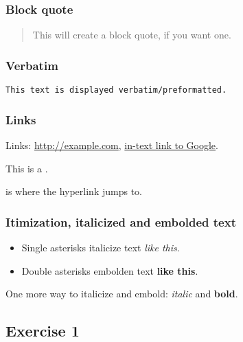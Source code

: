 \documentclass[
  11pt,
]{article}
\providecommand{\tightlist}{%
  \setlength{\itemsep}{0pt}\setlength{\parskip}{0pt}}
\begin{document}
\hypertarget{block-quote}{%
\subsubsection{Block quote}\label{block-quote}}

\begin{quote}
This will create a block quote, if you want one.
\end{quote}

\hypertarget{verbatim}{%
\subsubsection{Verbatim}\label{verbatim}}

\begin{verbatim}
This text is displayed verbatim/preformatted.
\end{verbatim}

\hypertarget{links}{%
\subsubsection{Links}\label{links}}

Links: \url{http://example.com}, \href{http://google.com}{in-text link
to Google}.

This is a \hyperlink{target1}{{}}.

\hypertarget{target1}{{}}

is where the hyperlink jumps to.

\hypertarget{itimization-italicized-and-embolded-text}{%
\subsubsection{Itimization, italicized and embolded
text}\label{itimization-italicized-and-embolded-text}}

\begin{itemize}
\tightlist
\item
  Single asterisks italicize text \emph{like this}.
\item
  Double asterisks embolden text \textbf{like this}.
\end{itemize}

One more way to italicize and embold: \emph{italic} and \textbf{bold}.

\hypertarget{exercise-1}{%
\subsection{Exercise 1}\label{exercise-1}}
\end{document}
